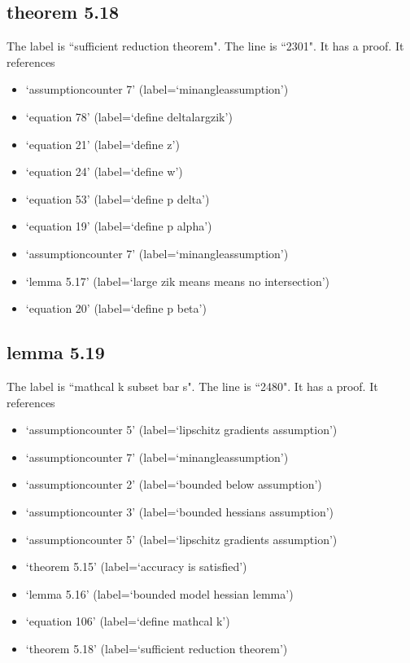 \documentclass{article}
\begin{document}
\subsection{theorem 5.18}
The label is ``sufficient reduction theorem".
The line is ``2301".
It has a proof.
It references \begin{itemize}
\item `assumptioncounter 7' (label=`minangleassumption')
\item `equation 78' (label=`define deltalargzik')
\item `equation 21' (label=`define z')
\item `equation 24' (label=`define w')
\item `equation 53' (label=`define p delta')
\item `equation 19' (label=`define p alpha')
\item `assumptioncounter 7' (label=`minangleassumption')
\item `lemma 5.17' (label=`large zik means means no intersection')
\item `equation 20' (label=`define p beta')
\end{itemize}
\subsection{lemma 5.19}
The label is ``mathcal k subset bar s".
The line is ``2480".
It has a proof.
It references \begin{itemize}
\item `assumptioncounter 5' (label=`lipschitz gradients assumption')
\item `assumptioncounter 7' (label=`minangleassumption')
\item `assumptioncounter 2' (label=`bounded below assumption')
\item `assumptioncounter 3' (label=`bounded hessians assumption')
\item `assumptioncounter 5' (label=`lipschitz gradients assumption')
\item `theorem 5.15' (label=`accuracy is satisfied')
\item `lemma 5.16' (label=`bounded model hessian lemma')
\item `equation 106' (label=`define mathcal k')
\item `theorem 5.18' (label=`sufficient reduction theorem')
\end{itemize}
\end{document}
